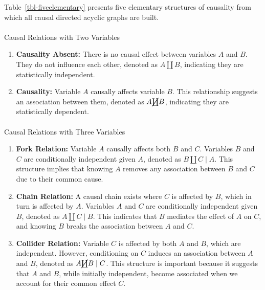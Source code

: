 \documentclass[
  single column]{article}
\makeatletter
\let\oldparagraph\paragraph
\renewcommand{\paragraph}{
    \@ifstar
      \xxxParagraphStar
      \xxxParagraphNoStar
  }
\newcommand{\xxxParagraphStar}[1]{\oldparagraph*{#1}\mbox{}}
\newcommand{\xxxParagraphNoStar}[1]{\oldparagraph{#1}\mbox{}}
\providecommand{\tightlist}{%
  \setlength{\itemsep}{0pt}\setlength{\parskip}{0pt}}\usepackage{longtable,booktabs,array}
\makeatother
\begin{document}
Table~\ref{tbl-fiveelementary} presents five elementary structures of
causality from which all causal directed acyclic graphs are built.

\paragraph{Causal Relations with Two
Variables}\label{causal-relations-with-two-variables}

\begin{enumerate}
\def\labelenumi{\arabic{enumi}.}
\tightlist
\item
  \textbf{Causality Absent:} There is no causal effect between variables
  \(A\) and \(B\). They do not influence each other, denoted as
  \(A \coprod B\), indicating they are statistically independent.
\item
  \textbf{Causality:} Variable \(A\) causally affects variable \(B\).
  This relationship suggests an association between them, denoted as
  \(A \cancel{\coprod} B\), indicating they are statistically dependent.
\end{enumerate}

\paragraph{Causal Relations with Three
Variables}\label{causal-relations-with-three-variables}

\begin{enumerate}
\def\labelenumi{\arabic{enumi}.}
\setcounter{enumi}{2}
\tightlist
\item
  \textbf{Fork Relation:} Variable \(A\) causally affects both \(B\) and
  \(C\). Variables \(B\) and \(C\) are conditionally independent given
  \(A\), denoted as \(B \coprod C \mid A\). This structure implies that
  knowing \(A\) removes any association between \(B\) and \(C\) due to
  their common cause.
\item
  \textbf{Chain Relation:} A causal chain exists where \(C\) is affected
  by \(B\), which in turn is affected by \(A\). Variables \(A\) and
  \(C\) are conditionally independent given \(B\), denoted as
  \(A \coprod C \mid B\). This indicates that \(B\) mediates the effect
  of \(A\) on \(C\), and knowing \(B\) breaks the association between
  \(A\) and \(C\).
\item
  \textbf{Collider Relation:} Variable \(C\) is affected by both \(A\)
  and \(B\), which are independent. However, conditioning on \(C\)
  induces an association between \(A\) and \(B\), denoted as
  \(A \cancel{\coprod} B \mid C\). This structure is important because
  it suggests that \(A\) and \(B\), while initially independent, become
  associated when we account for their common effect \(C\).
\end{enumerate}
\end{document}
